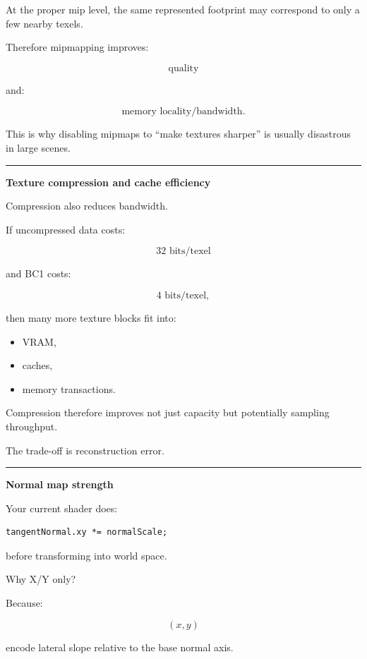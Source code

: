 At the proper mip level, the same represented footprint may correspond to only a few nearby texels.

Therefore mipmapping improves:

\[
\text{quality}
\]

and:

\[
\text{memory locality/bandwidth}.
\]

This is why disabling mipmaps to ``make textures sharper'' is usually disastrous in large scenes.

\begin{center}\rule{0.5\linewidth}{0.5pt}\end{center}

\textbf{Texture compression and cache efficiency}

Compression also reduces bandwidth.

If uncompressed data costs:

\[
32\text{ bits/texel}
\]

and BC1 costs:

\[
4\text{ bits/texel},
\]

then many more texture blocks fit into:

\begin{itemize}
\tightlist
\item
  VRAM,
\item
  caches,
\item
  memory transactions.
\end{itemize}

Compression therefore improves not just capacity but potentially sampling throughput.

The trade-off is reconstruction error.

\begin{center}\rule{0.5\linewidth}{0.5pt}\end{center}

\textbf{Normal map strength}

Your current shader does:

\begin{verbatim}
tangentNormal.xy *= normalScale;
\end{verbatim}

before transforming into world space.

Why X/Y only?

Because:

\[
(x,y)
\]

encode lateral slope relative to the base normal axis.


